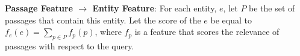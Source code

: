 \documentclass{article}
\begin{document}
\textbf{Passage Feature $\rightarrow$ Entity Feature}: For each entity, $e$, let $P$ be the set of passages that contain this entity. Let the score of the $e$ be equal to $f_e(e) = \sum_{p \in P}{f_p(p)}$, where $f_p$ is a feature that scores the relevance of passages with respect to the query.










\end{document}
